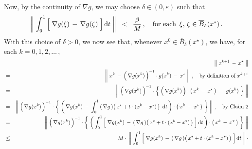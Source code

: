 \begin{enumerate}
	\vskip 0.3cm
	\noindent
	Now, by the continuity of $\nabla g$, we may choose $\delta \in (0,\varepsilon)$ such that
	\begin{equation*}
		\left\Vert\;
			\int_{0}^{1}
			\left[\;
				\overset{{\color{white}.}}{\nabla} g(\xi) \,-\, \nabla g(\zeta)
			\;\right]
			\d t
		\;\right\Vert
		\;\; < \;\; \dfrac{\beta}{M}\,,
		\quad
		\textnormal{for each \,$\xi, \, \zeta \in \overline{B}_{\delta}(x^{\star})$}\,.
	\end{equation*}
	With this choice of $\delta > 0$, we now see that,
	whenever $x^{0} \in \overline{B}_{\delta}(x^{\star})$, we have, for each $k = 0, 1, 2, \ldots$\,,
	\begin{eqnarray*}
	&&
		\left\Vert\;x^{k+1} \,-\, x^{\star}\;\right\Vert
	\\
	&\overset{{\color{white}\textnormal{\Large 1}}}{=}&
		\left\Vert\;x^{k} \,-\, \left(\,\overset{{\color{white}.}}{\nabla} g(x^{k})\,\right)^{-1}\cdot g(x^{k}) \,-\, x^{\star}\;\right\Vert\,,
		\quad
		\textnormal{by definition of $x^{k+1}$}
	\\
	&=&
		\left\Vert\;
			\left(\,\overset{{\color{white}.}}{\nabla} g(x^{k})\,\right)^{-1}
			\cdot
			\left\{\;
				\left(\,\overset{{\color{white}.}}{\nabla} g(x^{k})\,\right)\cdot\left(\,x^{k} \,-\, x^{\star}\,\right)
				\;-\; g(x^{k}) 
			\;\right\}
		\;\right\Vert
	\\
	&=&
		\left\Vert\;
			\left(\,\overset{{\color{white}.}}{\nabla} g(x^{k})\,\right)^{-1}
			\cdot
			\left\{\;
				\left(\,
					\overset{{\color{white}.}}{\nabla} g(x^{k})
					\,-\,
					\int_{0}^{1}
					\left(\,\nabla g\,\right)\!\left(\,x^{\star} + t\cdot(x^{k}-x^{\star})\,\right) 
					\;\d t
				\,\right)
				\cdot\left(\,x^{k} \,-\, x^{\star}\,\right)
			\;\right\}
		\;\right\Vert\,,
		\quad
		\textnormal{by Claim 2}
	\\
	&=&
		\left\Vert\;
			\left(\,\overset{{\color{white}.}}{\nabla} g(x^{k})\,\right)^{-1}
			\cdot
			\left\{\;
				\left(\,
					\int_{0}^{1}
					\left[\;
						\overset{{\color{white}.}}{\nabla} g(x^{k})
						\,-\,
						\left(\,\nabla g\,\right)\!\left(\,x^{\star} + t\cdot(x^{k}-x^{\star})\,\right)
					\;\right]
					\d t
				\,\right)
				\cdot\left(\,x^{k} \,-\, x^{\star}\,\right)
			\;\right\}
		\;\right\Vert
	\\
	&\leq&
		M \cdot\,
		\left\Vert\;
			\int_{0}^{1}
			\left[\;
				\overset{{\color{white}.}}{\nabla} g(x^{k})
				\,-\,
				\left(\,\nabla g\,\right)\!\left(\,x^{\star} + t\cdot(x^{k}-x^{\star})\,\right)
			\;\right]
			\d t
		\;\right\Vert
		\cdot

\end{eqnarray*}
\end{enumerate}
